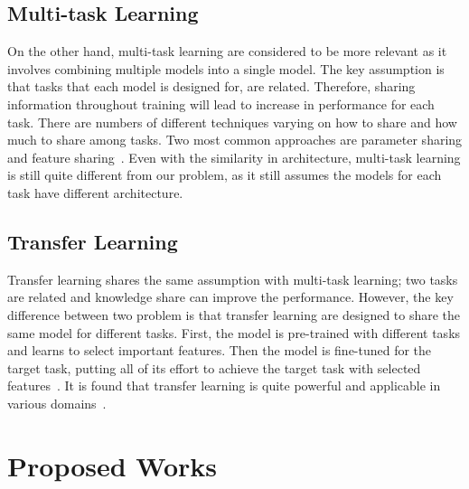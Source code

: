 \documentclass{article}
\begin{document}
\subsection{Multi-task Learning}
On the other hand, multi-task learning are considered to be more relevant as it involves combining multiple models into a single model. The key assumption is that tasks that each model is designed for, are related. Therefore, sharing information throughout training will lead to increase in performance for each task. There are numbers of different techniques varying on how to share and how much to share among tasks. Two most common approaches are parameter sharing and feature sharing~\cite{ruder2017overview, Caruana1993MultitaskLA, duong2015low, lu2017fully}. Even with the similarity in architecture, multi-task learning is still quite different from our problem, as it still assumes the models for each task have different architecture.

\subsection{Transfer Learning}

Transfer learning shares the same assumption with multi-task learning; two tasks are related and knowledge share can improve the performance. However, the key difference between two problem is that transfer learning are designed to share the same model for different tasks. First, the model is pre-trained with different tasks and learns to select important features. Then the model is fine-tuned for the target task, putting all of its effort to achieve the target task with selected features~\cite{yosinski2014transferable}. It is found that transfer learning is quite powerful and applicable in various domains~\cite{raina2007self, egan2004effects, glorot2011domain}.

\section{Proposed Works}

\end{document}
